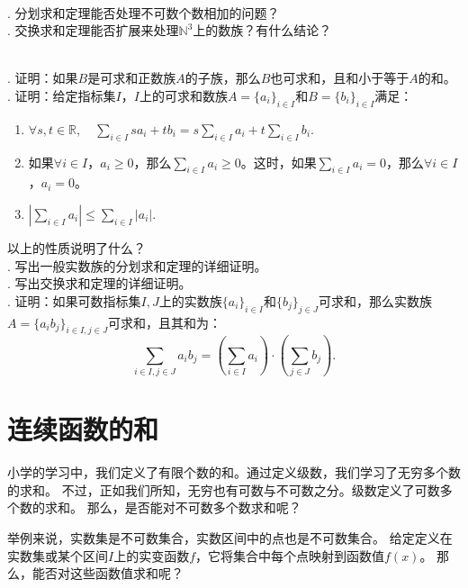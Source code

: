 \documentclass[12pt,UTF8,fontset=none]{ctexbook}
\begin{document}
\begin{sk}
    \mbox{} \\
    . 分划求和定理能否处理不可数个数相加的问题？\\
    . 交换求和定理能否扩展来处理$\mathbb{N}^3$上的数族？有什么结论？
\end{sk}

\begin{xt}
    \mbox{} \\
    . 证明：如果$B$是可求和正数族$A$的子族，那么$B$也可求和，且和小于等于$A$的和。\\
    . 证明：给定指标集$I$，$I$上的可求和数族$A = \{a_i\}_{i\in I}$和$B = \{b_i\}_{i\in I}$满足：
    \begin{enumerate}
        \item $\displaystyle \forall s, t\in\mathbb{R}, \quad \sum_{i\in I} sa_i + tb_i = s\sum_{i\in I} a_i + t \sum_{i\in I} b_i.$
        \item 如果$\forall i\in I$，$a_i \geqslant 0$，那么$\sum_{i\in I} a_i \geqslant 0$。这时，如果$\sum_{i\in I} a_i = 0$，那么$\forall i\in I$，$a_i = 0$。
        \item $\left| \sum_{i\in I} a_i \right| \leqslant \sum_{i\in I} |a_i|. $
    \end{enumerate}
    \indent 以上的性质说明了什么？\\
    . 写出一般实数族的分划求和定理的详细证明。\\
    . 写出交换求和定理的详细证明。\\
    . 证明：如果可数指标集$I,J$上的实数族$\{a_i\}_{i\in I}$和$\{b_j\}_{j\in J}$可求和，那么实数族$A = \{a_ib_j\}_{i\in I, j\in J}$可求和，且其和为：
    $$ \sum_{i\in I, j\in J} a_i b_j = \left(\sum_{i\in I} a_i\right) \cdot \left(\sum_{j\in J} b_j\right). $$
\end{xt}

\chapter{连续函数的和}

小学的学习中，我们定义了有限个数的和。通过定义级数，我们学习了无穷多个数的求和。
不过，正如我们所知，无穷也有可数与不可数之分。级数定义了可数多个数的求和。
那么，是否能对不可数多个数求和呢？

举例来说，实数集是不可数集合，实数区间中的点也是不可数集合。
给定定义在实数集或某个区间$I$上的实变函数$f$，它将集合中每个点映射到函数值$f(x)$。
那么，能否对这些函数值求和呢？
\end{document}
